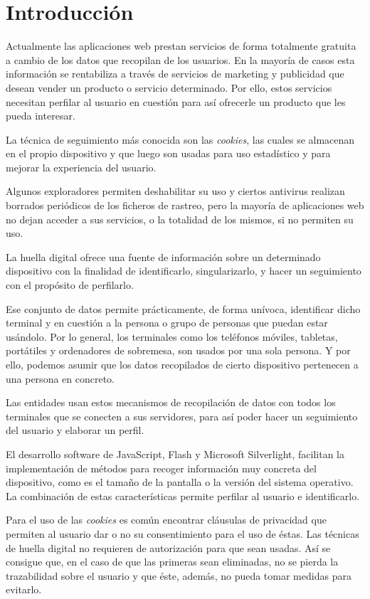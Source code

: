 \chapter{Introducción}

Actualmente las aplicaciones web prestan servicios de forma totalmente gratuita a cambio de los datos que recopilan de los usuarios. En la mayoría de casos esta información se rentabiliza a través de servicios de marketing y publicidad que desean vender un producto o servicio determinado. Por ello, estos servicios necesitan perfilar al usuario en cuestión para así ofrecerle un producto que les pueda interesar.\par
\vspace{3mm}
La técnica de seguimiento más conocida  son las \textit{cookies}, las cuales se almacenan en el propio dispositivo y que luego son usadas para uso estadístico y para mejorar la experiencia del usuario.\par
\vspace{3mm}
Algunos exploradores permiten deshabilitar su uso y ciertos antivirus realizan borrados periódicos de los ficheros de rastreo, pero la mayoría de aplicaciones web no dejan acceder a sus servicios, o la totalidad de los mismos, si no permiten su uso.\par
\vspace{3mm}
La huella digital ofrece una fuente de información sobre un determinado dispositivo con la finalidad de identificarlo, singularizarlo, y hacer un seguimiento con el propósito de perfilarlo.\par
\vspace{3mm}
Ese conjunto de datos permite prácticamente, de forma unívoca, identificar dicho terminal y en cuestión a la persona o grupo de personas que puedan estar usándolo. Por lo general, los terminales como los teléfonos móviles, tabletas, portátiles y ordenadores de sobremesa, son usados por una sola persona. Y por ello, podemos asumir que los datos recopilados de cierto dispositivo pertenecen a una persona en concreto.\par
\vspace{3mm}
Las entidades usan estos mecanismos de recopilación de datos con todos los terminales que se conecten a sus servidores, para así poder hacer un seguimiento del usuario y elaborar un perfil.\par
\vspace{3mm}
El desarrollo software de JavaScript, Flash y Microsoft Silverlight, facilitan la implementación de métodos para recoger información muy concreta del dispositivo, como es el tamaño de la pantalla o la versión del sistema operativo. La combinación de estas características permite perfilar al usuario e identificarlo.\par
\vspace{3mm}
Para el uso de las \textit{cookies} es común encontrar cláusulas de privacidad que permiten al usuario dar o no su consentimiento para el uso de éstas. Las técnicas de huella digital no requieren de autorización para que sean usadas. Así se consigue que, en el caso de que las primeras sean eliminadas, no se pierda la trazabilidad sobre el usuario y que éste, además, no pueda tomar medidas para evitarlo.\par
 \newpage
